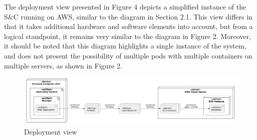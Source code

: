 The deployment view presented in Figure 4 depicts a simplified instance of the S\&C running on AWS, similar to the diagram in Section 2.1. This view differs in that it takes additional hardware and software elements into account, but from a logical standpoint, it remains very similar to the diagram in Figure 2. Moreover, it should be noted that this diagram highlights a single instance of the system, and does not present the possibility of multiple pods with multiple containers on multiple servers, as shown in Figure 2.

\begin{figure}[h]
    \centering
    \includegraphics[width=1\linewidth]{DD-Latex//assets//Deployment Diagram/Deployment Diagram.png}
    \caption{Deployment view}
    \label{fig:Deployment view}
\end{figure}